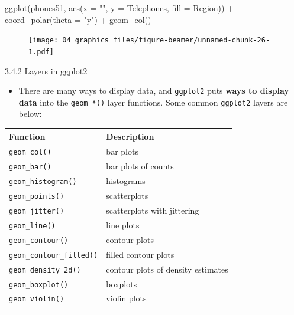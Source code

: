 \documentclass[
  9pt,
  a4paper,
  ignorenonframetext,
  notheorems]{beamer}
\newenvironment{Shaded}{\begin{snugshade}}{\end{snugshade}}
\newcommand{\AttributeTok}[1]{\textcolor[rgb]{0.40,0.45,0.13}{#1}}
\newcommand{\FunctionTok}[1]{\textcolor[rgb]{0.28,0.35,0.67}{#1}}
\newcommand{\NormalTok}[1]{\textcolor[rgb]{0.00,0.23,0.31}{#1}}
\newcommand{\SpecialCharTok}[1]{\textcolor[rgb]{0.37,0.37,0.37}{#1}}
\newcommand{\StringTok}[1]{\textcolor[rgb]{0.13,0.47,0.30}{#1}}
\providecommand{\tightlist}{%
  \setlength{\itemsep}{0pt}\setlength{\parskip}{0pt}}\usepackage{longtable,booktabs,array}
\begin{document}
\begin{frame}[fragile]
\begin{Shaded}
\begin{Highlighting}[]
\FunctionTok{ggplot}\NormalTok{(phones51, }\FunctionTok{aes}\NormalTok{(}\AttributeTok{x =} \StringTok{""}\NormalTok{, }\AttributeTok{y =}\NormalTok{ Telephones, }\AttributeTok{fill =}\NormalTok{ Region)) }\SpecialCharTok{+} 
  \FunctionTok{coord\_polar}\NormalTok{(}\AttributeTok{theta =} \StringTok{"y"}\NormalTok{) }\SpecialCharTok{+} \FunctionTok{geom\_col}\NormalTok{()}
\end{Highlighting}
\end{Shaded}

\begin{figure}

{\centering \texttt{[image: 04\_graphics\_files/figure-beamer/unnamed-chunk-26-1.pdf]}

}

\end{figure}
\end{frame}

\begin{frame}[fragile]
\begin{block}{3.4.2 Layers in ggplot2}
\protect\hypertarget{layers-in-ggplot2}{}
\begin{itemize}
\tightlist
\item
  There are many ways to display data, and \texttt{ggplot2} puts
  \textbf{ways to display data} into the \texttt{geom\_*()} layer
  functions. Some common \texttt{ggplot2} layers are below:
\end{itemize}

\begin{longtable}[]{@{}ll@{}}
\toprule\noalign{}
Function & Description \\
\midrule\noalign{}
\endhead
\texttt{geom\_col()} & bar plots \\
\texttt{geom\_bar()} & bar plots of counts \\
\texttt{geom\_histogram()} & histograms \\
\texttt{geom\_points()} & scatterplots \\
\texttt{geom\_jitter()} & scatterplots with jittering \\
\texttt{geom\_line()} & line plots \\
\texttt{geom\_contour()} & contour plots \\
\texttt{geom\_contour\_filled()} & filled contour plots \\
\texttt{geom\_density\_2d()} & contour plots of density estimates \\
\texttt{geom\_boxplot()} & boxplots \\
\texttt{geom\_violin()} & violin plots \\
\bottomrule\noalign{}
\end{longtable}
\end{block}
\end{frame}
\end{document}
